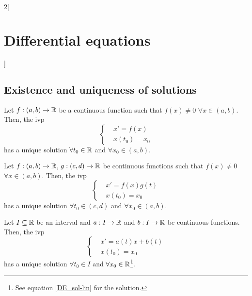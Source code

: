 \documentclass[../../../main.tex]{subfiles}
\begin{document}
\begin{multicols}{2}[\section{Differential equations}]
  \subsection{Existence and uniqueness of solutions}
  \begin{prop}
    Let $f:(a,b)\rightarrow\mathbb{R}$ be a continuous function such that $f(x)\ne 0$ $\forall x\in(a,b)$. Then, the ivp
    $$
      \left\{
      \begin{aligned}
         & x'      =f(x) \\
         & x(t_0)  =x_0
      \end{aligned}
      \right.
    $$
    has a unique solution $\forall t_0\in\mathbb{R}$ and $\forall x_0\in(a,b)$.
  \end{prop}
  \begin{prop}
    Let $f:(a,b)\rightarrow\mathbb{R}$, $g:(c,d)\rightarrow\mathbb{R}$ be continuous functions such that $f(x)\ne 0$ $\forall x\in(a,b)$. Then, the ivp
    $$\left\{
      \begin{aligned}
         & x'      =f(x)g(t) \\
         & x(t_0)  =x_0
      \end{aligned}
      \right.$$
    has a unique solution $\forall t_0\in(c,d)$ and $\forall x_0\in(a,b)$.
  \end{prop}
  \begin{prop}
    Let $I\subseteq\mathbb{R}$ be an interval and $a:I\rightarrow\mathbb{R}$ and $b:I\rightarrow\mathbb{R}$ be continuous functions. Then, the ivp
    $$\left\{
      \begin{aligned}
         & x'      =a(t)x+b(t) \\
         & x(t_0)  =x_0
      \end{aligned}
      \right.$$
    has a unique solution $\forall t_0\in I$ and $\forall x_0\in\mathbb{R}$\footnote{See equation \eqref{DE_sol-lin} for the solution.}.
  \end{prop}

\end{multicols}
\end{document}

